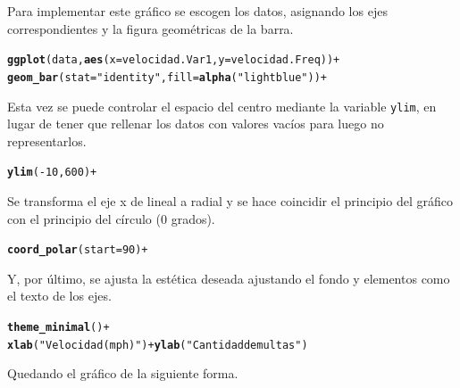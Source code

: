\documentclass{article}\usepackage[]{graphicx}\usepackage[]{color}
\makeatletter
\newcommand{\hlstr}[1]{\textcolor[rgb]{0.192,0.494,0.8}{#1}}%
\newcommand{\hlopt}[1]{\textcolor[rgb]{0,0,0}{#1}}%
\newcommand{\hlstd}[1]{\textcolor[rgb]{0.345,0.345,0.345}{#1}}%
\newcommand{\hlkwd}[1]{\textcolor[rgb]{0.737,0.353,0.396}{\textbf{#1}}}%
\newenvironment{kframe}{%
 \def\at@end@of@kframe{}%
 \ifinner\ifhmode%
  \def\at@end@of@kframe{\end{minipage}}%
  \begin{minipage}{\columnwidth}%
 \fi\fi%
 \def\FrameCommand##1{\hskip\@totalleftmargin \hskip-\fboxsep
 \colorbox{shadecolor}{##1}\hskip-\fboxsep
     \hskip-\linewidth \hskip-\@totalleftmargin \hskip\columnwidth}%
 \MakeFramed {\advance\hsize-\width
   \@totalleftmargin\z@ \linewidth\hsize
   \@setminipage}}%
 {\par\unskip\endMakeFramed%
 \at@end@of@kframe}
\newenvironment{knitrout}{}{} %
\makeatother
\begin{document}
Para implementar este gr\'afico se escogen los datos, asignando los ejes correspondientes y la figura geom\'etricas de la barra.
\begin{knitrout}
\color{fgcolor}\begin{kframe}
\begin{alltt}
\hlkwd{ggplot}(data, \hlkwd{aes}(x=velocidad.Var1, y=velocidad.Freq)) +
  \hlkwd{geom_bar}(stat=\hlstr{"identity"}, fill=\hlkwd{alpha}(\hlstr{"lightblue"})) +
\end{alltt}
\end{kframe}
\end{knitrout}
Esta vez se puede controlar el espacio del centro mediante la variable \texttt{ylim}, en lugar de tener que rellenar los datos con valores vac\'ios para luego no representarlos.
\begin{knitrout}
\color{fgcolor}\begin{kframe}
\begin{alltt}
  \hlkwd{ylim}(-10,600) +
\end{alltt}
\end{kframe}
\end{knitrout}
Se transforma el eje x de lineal a radial y se hace coincidir el principio del gr\'afico con el principio del c\'irculo (0 grados).
\begin{knitrout}
\color{fgcolor}\begin{kframe}
\begin{alltt}
  \hlkwd{coord_polar}(start = 90) +
\end{alltt}
\end{kframe}
\end{knitrout}
Y, por \'ultimo, se ajusta la est\'etica deseada ajustando el fondo y elementos como el texto de los ejes.
\begin{knitrout}
\color{fgcolor}\begin{kframe}
\begin{alltt}
  \hlkwd{theme_minimal}\hlstd{()} \hlopt{+}
  \hlkwd{xlab}\hlstd{(}\hlstr{"Velocidad (mph)"}\hlstd{)} \hlopt{+} \hlkwd{ylab}\hlstd{(}\hlstr{"Cantidad de multas"}\hlstd{)}
\end{alltt}
\end{kframe}
\end{knitrout}
\clearpage
Quedando el gr\'afico de la siguiente forma.
\end{document}
